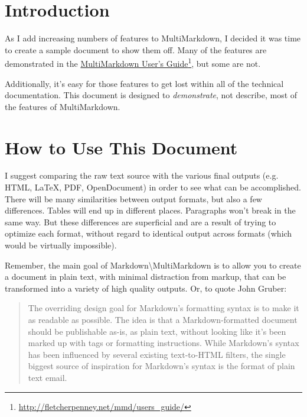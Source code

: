 
\def\mytitle{Sample MultiMarkdown Document}
\def\latexmode{memoir}
\def\keywords{MultiMarkdown, Markdown, XML, XHTML, XSLT, PDF}
\def\mycopyright{2011 Fletcher T. Penney.  \\
This work is licensed under a Creative Commons License.  \\
http:/\slash creativecommons.org\slash licenses\slash by-nc-sa\slash 3.0\slash }



\chapter{Introduction}
\label{introduction}

As I add increasing numbers of features to MultiMarkdown, I decided it was
time to create a sample document to show them off. Many of the features are
demonstrated in the \href{http://fletcherpenney.net/mmd/users_guide/}{MultiMarkdown User's Guide}\footnote{\href{http://fletcherpenney.net/mmd/users\_guide/}{http:/\slash fletcherpenney.net\slash mmd\slash users\_guide\slash }}, but some are not.

Additionally, it's easy for those features to get lost within all of the
technical documentation. This document is designed to \emph{demonstrate}, not
describe, most of the features of MultiMarkdown.

\chapter{How to Use This Document}
\label{howtousethisdocument}

I suggest comparing the raw text source with the various final outputs (e.g.
HTML, LaTeX, PDF, OpenDocument) in order to see what can be accomplished.
There will be many similarities between output formats, but also a few
differences. Tables will end up in different places. Paragraphs won't break in
the same way. But these differences are superficial and are a result of trying
to optimize each format, without regard to identical output across formats
(which would be virtually impossible).

Remember, the main goal of Markdown\textbackslash{}MultiMarkdown is to allow you to create a
document in plain text, with minimal distraction from markup, that can be
transformed into a variety of high quality outputs. Or, to quote John Gruber:

\begin{quote}

The overriding design goal for Markdown's formatting syntax is to make it as
readable as possible. The idea is that a Markdown-formatted document should be
publishable as-is, as plain text, without looking like it's been marked up
with tags or formatting instructions. While Markdown's syntax has been
influenced by several existing text-to-HTML filters, the single biggest source
of inspiration for Markdown's syntax is the format of plain text
email.~\citep{Gruber}
\end{quote}


